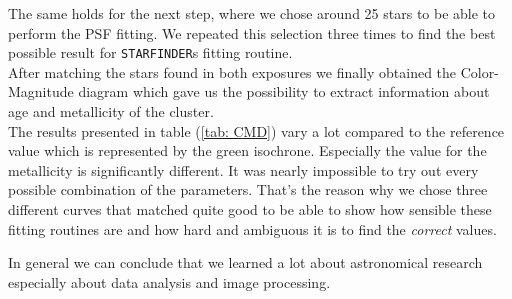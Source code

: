 \begin{description}
	The same holds for the next step, where we chose around 25 stars to be able to perform the PSF fitting. We repeated this selection three times to find the best possible result for \texttt{STARFINDER}s fitting routine. \\
	After matching the stars found in both exposures we finally obtained the Color-Magnitude diagram which gave us the possibility to extract information about age and metallicity of the cluster. \\
	The results presented in table (\ref{tab: CMD}) vary a lot compared to the reference value which is represented by the green isochrone. Especially the value for the metallicity is significantly different. It was nearly impossible to try out every possible combination of the parameters. That's the reason why we chose three different curves that matched quite good to be able to show how sensible these fitting routines are and how hard and ambiguous it is to find the \textit{correct} values.\\ 

\end{description}
In general we can conclude that we learned a lot about astronomical research especially about data analysis and image processing. 